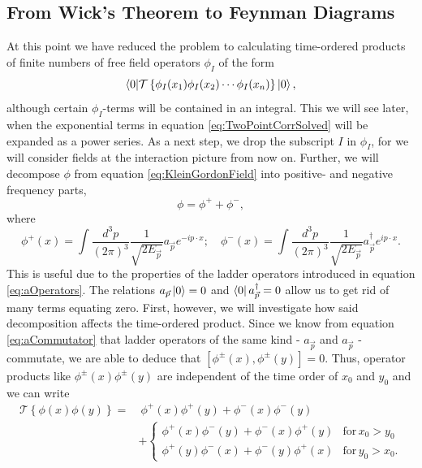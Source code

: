 \subsection{From Wick's Theorem to Feynman Diagrams} \label{sec:WicksTheorem}
At this point we have reduced the problem to calculating time-ordered products of finite numbers of free field operators $\phi_I$ of the form
\begin{equation}
    \braket{0|\mathcal{T}\left\{ \phi_I(x_1)\phi_I(x_2)\cdots\phi_I(x_n) \right\}|0},
\end{equation}
although certain $\phi_I$-terms will be contained in an integral. This we will see later, when the exponential terms in equation \ref{eq:TwoPointCorrSolved} will be expanded as a power series. As a next step, we drop the subscript $I$ in $\phi_I$, for we will consider fields at the interaction picture from now on. Further, we will decompose $\phi$ from equation \ref{eq:KleinGordonField} into positive- and negative frequency parts,
\begin{equation}
    \phi = \phi^+ +\phi^-,
\end{equation}
where
\begin{equation}\label{eq:PhiPlusMinus}
    \phi^+(x) = \int\frac{d^3p}{(2\pi)^3}\frac{1}{ \sqrt{2E_{\vec{p}}} } a_{\vec{p}} e^{-ip \cdot x} ; \quad 
    \phi^-(x) = \int\frac{d^3p}{(2\pi)^3}\frac{1}{ \sqrt{2E_{\vec{p}}} } a_{\vec{p}}^{\dagger} e^{ip\cdot x}.
\end{equation}
This is useful due to the properties of the ladder operators introduced in equation \ref{eq:aOperators}. The relations $a_{\vec{p}}\ket{0} = 0$ and $\bra{0}a_{\vec{p}}^{\dagger} = 0$ allow us to get rid of many terms equating zero. First, however, we will investigate how said decomposition affects the time-ordered product. Since we know from equation \ref{eq:aCommutator} that ladder operators of the same kind - \eg $a_{\vec{p}}$ and $a_{\vec{p}}$ - commutate, we are able to deduce that $ \left[ \phi^{\pm}(x),\phi^{\pm}(y) \right] = 0$. Thus, operator products like $\phi^{\pm}(x)\phi^{\pm}(y)$ are independent of the time order of $x_0$ and $y_0$ and we can write
\begin{align}
    \mathcal{T}\left\{ \phi(x)\phi(y) \right\} =& \ \phi^+(x)\phi^+(y) + \phi^-(x)\phi^-(y) \nonumber \\ &+
    \begin{cases}
        \phi^+(x)\phi^-(y) + \phi^-(x)\phi^+(y) & \text{for}\, x_0 > y_0  \\
        \phi^+(y)\phi^-(x) + \phi^-(y)\phi^+(x) & \text{for}\, y_0 > x_0.
    \end{cases} \label{eq:WicksTheorem1}
\end{align}
